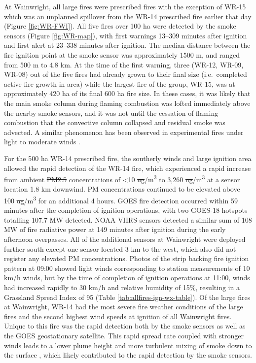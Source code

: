 \documentclass[fire,article,submit,moreauthors]{mdpi}
\providecommand{\DIFadd}[1]{{\protect\color{blue}\uwave{#1}}} %
\providecommand{\DIFdel}[1]{{\protect\color{red}\sout{#1}}} %
\providecommand{\DIFaddbegin}{} %
\providecommand{\DIFaddend}{} %
\providecommand{\DIFdelbegin}{} %
\providecommand{\DIFdelend}{} %
\begin{document}
At Wainwright, all large fires were prescribed fires with the exception
of WR-15 which was an unplanned spillover from the WR-14 prescribed fire
earlier that day (Figure \ref{fig:WR-FWI}). All five fires over 100 ha
were detected by the smoke sensors (Figure \ref{fig:WR-map}), with first
warnings 13--309 minutes after ignition and first alert at 23--338
minutes after ignition. The median distance between the fire ignition
point at the smoke sensor was approximately 1500 m, and ranged from 500
m to 4.8 km. At the time of the first warning, three (WR-12, WR-09,
WR-08) out of the five fires had already grown to their final size
(i.e.~completed active fire growth in area) while the largest fire of
the group, WR-15, was at approximately 420 ha of its final 600 ha fire
size. In these cases, it was likely that the main smoke column during
flaming combustion was lofted immediately above the nearby smoke
sensors, and it was not until the cessation of flaming combustion that
the convective column collapsed and residual smoke was advected. A
similar phenomenon has been observed in experimental fires under light
to moderate winds \citep{hudaStudyFuelSmokeDynamics2020}.

For the 500 ha WR-14 prescribed fire, the southerly winds and large
ignition area allowed the rapid detection of the WR-14 fire, which
experienced a rapid increase from ambient \DIFdelbegin \DIFdel{PM2.5 }\DIFdelend \DIFaddbegin \DIFadd{PM\textsubscript{2.5}
}\DIFaddend concentrations of \textless10 \DIFdelbegin \DIFdel{ug}\DIFdelend \DIFaddbegin \DIFadd{\(\mu\)g}\DIFaddend /m\textsuperscript{3} to 3,260
\DIFdelbegin \DIFdel{ug}\DIFdelend \DIFaddbegin \DIFadd{\(\mu\)g}\DIFaddend /m\textsuperscript{3} at a sensor location 1.8 km downwind. PM
concentrations continued to be elevated above 100
\DIFdelbegin \DIFdel{ug}\DIFdelend \DIFaddbegin \DIFadd{\(\mu\)g}\DIFaddend /m\textsuperscript{3} for an additional 4 hours. GOES fire
detection occurred within 59 minutes after the completion of ignition
operations, with two GOES-18 hotspots totalling 107.7 MW detected. NOAA
VIIRS sensors detected a similar sum of 108 MW of fire radiative power
at 149 minutes after ignition during the early afternoon overpasses. All
of the additional sensors at Wainwright were deployed further south
except one sensor located 3 km to the west, which also did not register
any elevated PM concentrations. Photos of the strip backing fire
ignition pattern at 09:00 showed light winds corresponding to station
measurements of 10 km/h winds, but by the time of completion of ignition
operations at 11:00, winds had increased rapidly to 30 km/h and relative
humidity of 15\%, resulting in a Grassland Spread Index of 95 (Table
\ref{tab:allfires-ign-wx-table}). Of the large fires at Wainwright,
WR-14 had the most severe fire weather conditions of the large fires and
the second highest wind speeds at ignition of all Wainwright fires.
Unique to this fire was the rapid detection both by the smoke sensors as
well as the GOES geostationary satellite. This rapid spread rate coupled
with stronger winds leads to a lower plume height and more turbulent
mixing of smoke down to the surface
\citep{freitasTechnicalNoteSensitivity2010}, which likely contributed to
the rapid detection by the smoke sensors.
\end{document}
